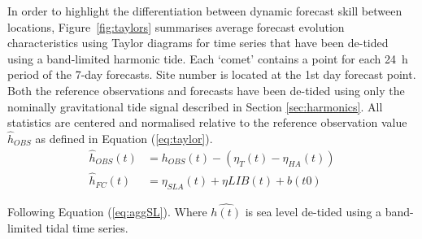 In order to highlight the differentiation between dynamic forecast skill between locations, Figure~\ref{fig:taylors} summarises average forecast evolution characteristics using Taylor diagrams \cite{Taylor:2000wp} for time series that have been de-tided using a band-limited harmonic tide.
Each `comet' contains a point for each 24~h period of the 7-day forecasts.
Site number is located at the 1st day forecast point.
Both the reference observations and forecasts have been de-tided using only the nominally gravitational tide signal described in Section \ref{sec:harmonics}.
All statistics are centered and normalised relative to the reference observation value $\hat{h}_{OBS}$ as defined in Equation (\ref{eq:taylor}).
\begin{equation}
\begin{split}
\hat{h}_{OBS}(t) &= h_{OBS}(t) - (\eta_{T}(t) - \eta_{HA}(t))  \\ 
\hat{h}_{FC}(t)  &= \eta_{SLA}(t) + \eta{LIB}(t) + b(t0) 
\label{eq:taylor}
\end{split}
\end{equation}

Following Equation (\ref {eq:aggSL}).  Where $\hat{h(t)}$ is sea level de-tided using a band-limited tidal time series.  





